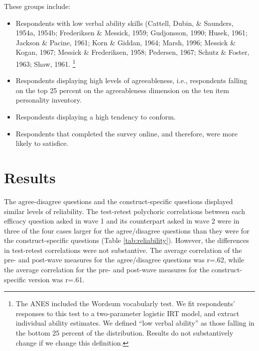 \documentclass[man,apacite,floatsintext]{apa6}
\begin{document}
These groups include:
\begin{itemize}
\item Respondents with low verbal ability skills (Cattell, Dubin, \& Saunders, 1954a, 1954b; Frederiksen \& Messick, 1959; Gudjonsson, 1990; Husek, 1961; Jackson \& Pacine, 1961; Korn \& Giddan, 1964; Marsh, 1996; Messick \& Kogan, 1967; Messick & Frederiksen, 1958; Pedersen, 1967; Schutz \& Foster, 1963; Shaw, 1961. \footnote{The ANES included the Wordsum vocabularly test. We fit respondents' responses to this test to a two-parameter logistic IRT model, and extract individual ability estimates. We defined ``low verbal ability'' as those falling in the bottom 25 percent of the distribution. Results do not substantively change if we change this definition.}
\item Respondents displaying high levels of agreeableness, i.e., respondents falling on the top 25 percent on the agreeableness dimension on the ten item personality inventory. 
\item Respondents displaying a high tendency to conform.  
\item Respondents that completed the survey online, and therefore, were more likely to satisfice.  

\end{itemize}

\section{Results}

The agree-disagree questions and the construct-specific questions displayed similar levels of reliability. The test-retest polychoric correlations between each efficacy question asked in wave 1 and its counterpart asked in wave 2 were in three of the four cases larger for the agree/disagree questions than they were for the construct-specific questions (Table \ref{tab:reliability}). However, the differences in test-retest correlations were not substantive. The average correlation of the pre- and post-wave measures for the agree/disagree questions was r=.62, while the average correlation for the pre- and post-wave measures for the construct-specific version was r=.61. 


\end{document}
